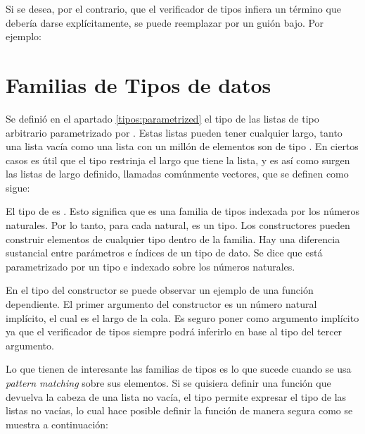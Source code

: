 Si se desea, por el contrario, que el verificador de tipos infiera un término que debería darse explícitamente, se puede reemplazar por un guión bajo. Por ejemplo:


\section{Familias de Tipos de datos}\label{agda:family}

Se definió en el apartado \ref{tipos:parametrized} el tipo de las listas de tipo arbitrario parametrizado por . Estas listas pueden tener cualquier largo, tanto una lista vacía como una lista con un millón de elementos son de tipo  . En ciertos casos es útil que el tipo restrinja el largo que tiene la lista, y es así como surgen las listas de largo definido, llamadas comúnmente vectores, que se definen como sigue:


El tipo de   es  \AgdaSymbol{$\rightarrow$} . Esto significa que   es una familia de tipos indexada por los números naturales. Por lo tanto, para cada  natural,   es un tipo. Los constructores pueden construir elementos de cualquier tipo dentro de la familia. Hay una diferencia sustancial entre parámetros e índices de un tipo de dato. Se dice que  está parametrizado por un tipo  e indexado sobre los números naturales. 

En el tipo del constructor \AgdaFunction{\_::\_} se puede observar un ejemplo de una función dependiente. El primer argumento del constructor es un número natural  implícito, el cual es el largo de la cola. Es seguro poner  como argumento implícito ya que el verificador de tipos siempre podrá inferirlo en base al tipo del tercer argumento. 

Lo que tienen de interesante las familias de tipos es lo que sucede cuando se usa \textit{pattern matching} sobre sus elementos. Si se quisiera definir una función que devuelva la cabeza de una lista no vacía, el tipo  permite expresar el tipo de las listas no vacías, lo cual hace posible definir la función  de manera segura como se muestra a continuación: 

